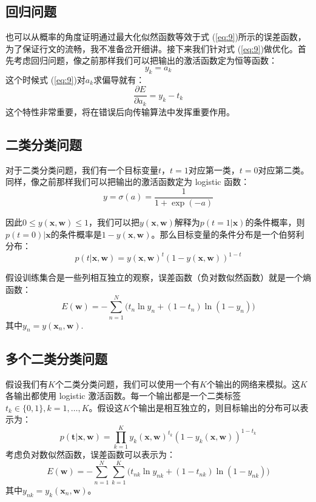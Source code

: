 \documentclass[10pt,a4paper,UTF8]{article}
\begin{document}
\subsection{回归问题}
\label{sec:org366b8ff}
也可以从概率的角度证明通过最大化似然函数等效于式 (\ref{eq:9})所示的误差函数，为了保证行文的流畅，我不准备岔开细讲。接下来我们针对式 (\ref{eq:9})做优化。首先考虑回归问题，像之前那样我们可以把输出的激活函数定为恒等函数：
\begin{equation}
\label{eq:10}
y_{k} = a_{k}
\end{equation}
这个时候式 (\ref{eq:9})对\(a_{k}\)求偏导就有：
\begin{equation}
\label{eq:11}
\frac{\partial E}{\partial a_{k}} = y_{k} - t_{k}
\end{equation}
这个特性非常重要，将在错误后向传输算法中发挥重要作用。

\subsection{二类分类问题}
\label{sec:org91fc171}
对于二类分类问题，我们有一个目标变量\(t\)，\(t=1\)对应第一类，\(t=0\)对应第二类。同样，像之前那样我们可以把输出的激活函数定为 logistic 函数：
\begin{equation}
\label{eq:12}
y =\sigma(a) = \frac{1}{1 + \exp(-a)}
\end{equation}

因此\(0 \leq y(\mathbf{x},\mathbf{w}) \leq 1\)，我们可以把\(y(\mathbf{x},\mathbf{w})\)解释为\(p(t=1| \mathbf{x})\)的条件概率，则\(p(t=0)| \mathbf{x}\)的条件概率是\(1-y(\mathbf{x},\mathbf{w})\)。那么目标变量的条件分布是一个伯努利分布：
\begin{equation}
\label{eq:13}
p(t|\mathbf{x},\mathbf{w}) = y(\mathbf{x},\mathbf{w})^{t} (1-y(\mathbf{x},\mathbf{w}))^{1-t}
\end{equation}

假设训练集合是一些列相互独立的观察，误差函数（负对数似然函数）就是一个熵函数：
\begin{equation}
\label{eq:14}
E(\mathbf{w}) = -\sum_{n=1}^{N} \bigg( t_{n}\ln y_{n} + (1-t_{n}) \ln(1-y_{n}) \bigg)
\end{equation}
其中\(y_{n} = y(\mathbf{x}_{n},\mathbf{w})\).

\subsection{多个二类分类问题}
\label{sec:orgf28aa38}

假设我们有\(K\)个二类分类问题，我们可以使用一个有\(K\)个输出的网络来模拟。这\(K\)各输出都使用 logistic 激活函数。每一个输出都是一个二类标签\(t_{k}\in \{0,1\},k=1,\ldots ,K\)。假设这\(K\)个输出是相互独立的，则目标输出的分布可以表示为：
\begin{equation}
\label{eq:15}
p(\mathbf{t}|\mathbf{x},\mathbf{w}) =\prod_{k=1}^{K} y_{k}(\mathbf{x},\mathbf{w})^{t_{k}} (1-y_{k}(\mathbf{x},\mathbf{w}))^{1-t_{k}}
\end{equation}
考虑负对数似然函数，误差函数可以表示为：
\begin{equation}
\label{eq:16}
E(\mathbf{w}) = -\sum_{n=1}^{N}\sum_{k=1}^{K} \bigg( t_{nk}\ln y_{nk} + (1-t_{nk}) \ln (1-y_{nk})\bigg)
\end{equation}
其中\(y_{nk} = y_{k}(\mathbf{x}_{n},\mathbf{w})\)。
\end{document}
